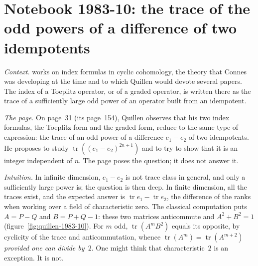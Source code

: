 \section[Notebook 1983-10: traces of odd powers of $P - Q$]{Notebook 1983-10: the trace of the odd powers of a difference of two idempotents\protect\piste\protect{}}\label{sec:quillen-1983-10}

\emph{Context.}  works on index formulas in cyclic cohomology, the theory that Connes was developing at the time and to which Quillen would devote several papers. The index of a Toeplitz operator, or of a graded operator, is written there as the trace of a sufficiently large odd power of an operator built from an idempotent.

\emph{The page.} On page~31 (its page~154), Quillen observes that his two index formulas, the Toeplitz form and the graded form, reduce to the same type of expression: the trace of an odd power of a difference $e_1 - e_2$ of two idempotents. He proposes to study $\operatorname{tr}((e_1 - e_2)^{2n+1})$ and to try to show that it is an integer independent of $n$. The page poses the question; it does not answer it.

\emph{Intuition.} In infinite dimension, $e_1 - e_2$ is not trace class in general, and only a sufficiently large power is; the question is then deep. In finite dimension, all the traces exist, and the expected answer is $\operatorname{tr} e_1 - \operatorname{tr} e_2$, the difference of the ranks when working over a field of characteristic zero. The classical computation puts $A = P - Q$ and $B = P + Q - 1$: these two matrices anticommute and $A^2 + B^2 = 1$ (figure~\ref{fig:quillen-1983-10}). For $m$ odd, $\operatorname{tr}(A^m B^2)$ equals its opposite, by cyclicity of the trace and anticommutation, whence $\operatorname{tr}(A^m) = \operatorname{tr}(A^{m+2})$ \emph{provided one can divide by~$2$}. One might think that characteristic~$2$ is an exception. It is not.


